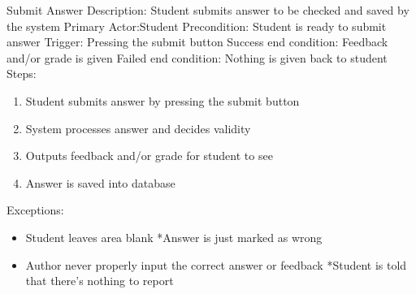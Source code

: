     
    \begin{section}{Submit Answer}
        Description: Student submits answer to be checked and saved by the system \newline
        Primary Actor:Student \newline
        Precondition: Student is ready to submit answer \newline
        Trigger: Pressing the submit button \newline
        Success end condition: Feedback and/or grade is given       \newline
        Failed end condition: Nothing is given back to student      \newline
        \newline
        Steps:
        \begin{enumerate}
            \item{Student submits answer by pressing the submit             button}
            \item{System processes answer and decides validity}
            \item{Outputs feedback and/or grade for student to see}
            \item{Answer is saved into database}
        \end{enumerate}
        Exceptions:
        \begin{itemize}
            \item{Student leaves area blank \newline
        	*Answer is just marked as wrong}
            \item{Author never properly input the correct answer or     feedback \newline
        	*Student is told that there's nothing to report}
        \end{itemize}
    \end{section}


